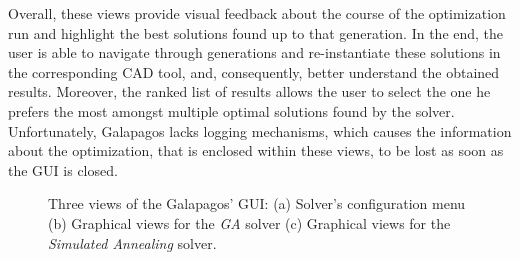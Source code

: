 	Overall, these views provide visual feedback about the course of the optimization run and highlight the best solutions found up to that generation. In the end, the user is able to navigate through generations and re-instantiate these solutions in the corresponding \ac{CAD} tool, and, consequently, better understand the obtained results. Moreover, the ranked list of results allows the user to select the one he prefers the most amongst multiple optimal solutions found by the solver. Unfortunately, Galapagos lacks logging mechanisms, which causes the information about the optimization, that is enclosed within these views, to be lost as soon as the \ac{GUI} is closed. 
	\begin{figure}[]
		\centering
		\hfill
		\hfill
		
		\caption[Galapagos GUI]{Three views of the Galapagos' \ac{GUI}: (a) Solver's configuration menu (b) Graphical views for the \textit{\ac{GA}} solver (c) Graphical views for the \textit{Simulated Annealing} solver.}
		\label{fig:galapagos}
	\end{figure}
	
